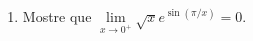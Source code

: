 \begin{enumerate}

\item Mostre que $\lim\limits_{x\to 0^+}\sqrt{x}e^{\sin(\pi/x)}=0$.
\end{enumerate}